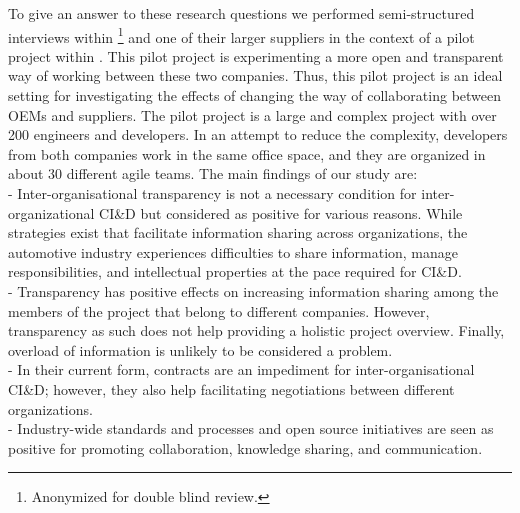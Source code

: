 To give an answer to these research questions we performed semi-structured interviews within \company{}\footnote{Anonymized for double blind review.} %
and 
one of their larger suppliers in the context of a pilot project within \company{}. %
This pilot project is experimenting a more open and transparent way of working between these two companies. Thus, this pilot project is an ideal setting for investigating the effects of changing the way of collaborating between OEMs and suppliers.  
The pilot project is a large and complex project with over 200 engineers and developers. 
In an attempt to reduce the complexity, developers from both companies work in the same office space, and they are organized in about 30 different agile teams. %
The main findings of our study are:\\
{} - Inter-organisational transparency is not a necessary condition for inter-organizational CI\&D but considered as positive for various reasons. %
While strategies exist that facilitate information sharing  across organizations, the automotive industry experiences difficulties to share information, manage responsibilities, and intellectual properties at the pace required for CI\&D.\\ %
{} - Transparency has positive effects on increasing information sharing among the members of the project that belong to different companies. However, transparency as such does not help providing a holistic project overview. Finally, overload of information is unlikely to be considered a problem.\\
{} - In their current form, contracts are an impediment for inter-or\-ga\-nisational CI\&D; however, they also help facilitating negotiations between different organizations. \\
{} - Industry-wide standards and processes and open source initiatives are seen as positive for promoting collaboration, knowledge sharing, and communication.


